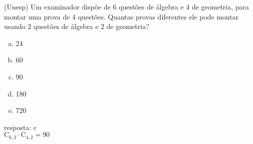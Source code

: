 \begin{ex}
 (Unesp) Um examinador dispõe de 6 questões de álgebra e 4 de geometria, para montar uma prova de 4 questões. Quantas provas diferentes ele pode montar usando 2 questões de álgebra e 2 de geometria?
    \begin{enumerate}[(a)]
    \item 24
    \item 60
    \item 90
    \item 180
    \item 720
    \end{enumerate}
      \begin{sol}
       resposta: c \\
       $\mathrm{C}_{6,2}\cdot\mathrm{C}_{4,2}=90$
      \end{sol}
\end{ex}